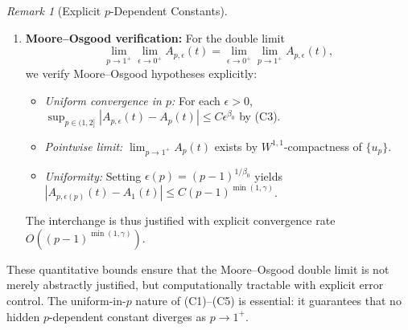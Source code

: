 \documentclass[12pt]{article}
\theoremstyle{plain}
\theoremstyle{definition}
\theoremstyle{remark}
\newtheorem{remark}[theorem]{Remark}
\begin{document}
\begin{remark}[Explicit $p$-Dependent Constants]
\begin{enumerate}
    \item[(C6)] \textbf{Moore--Osgood verification:} For the double limit
    \[ \lim_{p \to 1^+} \lim_{\epsilon \to 0^+} A_{p,\epsilon}(t) = \lim_{\epsilon \to 0^+} \lim_{p \to 1^+} A_{p,\epsilon}(t), \]
    we verify Moore--Osgood hypotheses explicitly:
    \begin{itemize}
        \item \emph{Uniform convergence in $p$:} For each $\epsilon > 0$, $\sup_{p \in (1,2]} |A_{p,\epsilon}(t) - A_p(t)| \leq C\epsilon^{\beta_0}$ by (C3).
        \item \emph{Pointwise limit:} $\lim_{p \to 1^+} A_p(t)$ exists by $W^{1,1}$-compactness of $\{u_p\}$.
        \item \emph{Uniformity:} Setting $\epsilon(p) = (p-1)^{1/\beta_0}$ yields $|A_{p,\epsilon(p)}(t) - A_1(t)| \leq C(p-1)^{\min(1, \gamma)}$.
    \end{itemize}
    The interchange is thus justified with explicit convergence rate $O((p-1)^{\min(1,\gamma)})$.
\end{enumerate}
These quantitative bounds ensure that the Moore--Osgood double limit is not merely abstractly justified, but computationally tractable with explicit error control. The uniform-in-$p$ nature of (C1)--(C5) is essential: it guarantees that no hidden $p$-dependent constant diverges as $p \to 1^+$.
\end{remark}

\end{document}
